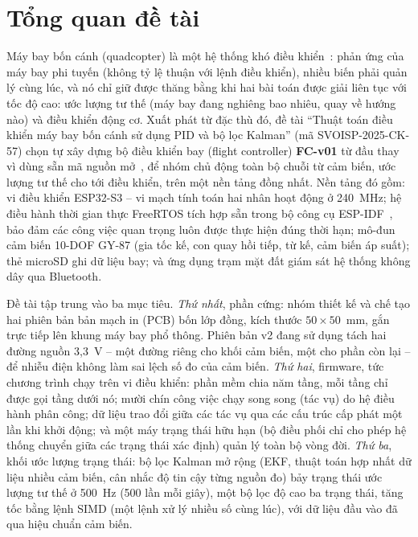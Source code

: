 \chapter{Tổng quan đề tài}

Máy bay bốn cánh (quadcopter) là một hệ thống khó điều khiển~\cite{quan2020}: phản ứng của máy bay phi tuyến (không tỷ lệ thuận với lệnh điều khiển), nhiều biến phải quản lý cùng lúc, và nó chỉ giữ được thăng bằng khi hai bài toán được giải liên tục với tốc độ cao: ước lượng tư thế (máy bay đang nghiêng bao nhiêu, quay về hướng nào) và điều khiển động cơ. Xuất phát từ đặc thù đó, đề tài ``Thuật toán điều khiển máy bay bốn cánh sử dụng PID và bộ lọc Kalman'' (mã SVOISP-2025-CK-57) chọn tự xây dựng bộ điều khiển bay (flight controller) \textbf{FC-v01} từ đầu thay vì dùng sẵn mã nguồn mở~\cite{ardupilot-esp32,px4-hw}, để nhóm chủ động toàn bộ chuỗi từ cảm biến, ước lượng tư thế cho tới điều khiển, trên một nền tảng đồng nhất. Nền tảng đó gồm: vi điều khiển ESP32-S3 -- vi mạch tính toán hai nhân hoạt động ở 240~MHz; hệ điều hành thời gian thực FreeRTOS tích hợp sẵn trong bộ công cụ ESP-IDF~\cite{idf-freertos}, bảo đảm các công việc quan trọng luôn được thực hiện đúng thời hạn; mô-đun cảm biến 10-DOF GY-87 (gia tốc kế, con quay hồi tiếp, từ kế, cảm biến áp suất); thẻ microSD ghi dữ liệu bay; và ứng dụng trạm mặt đất giám sát hệ thống không dây qua Bluetooth.

Đề tài tập trung vào ba mục tiêu. \textit{Thứ nhất}, phần cứng: nhóm thiết kế và chế tạo hai phiên bản bản mạch in (PCB) bốn lớp đồng, kích thước $50 \times 50$~mm, gắn trực tiếp lên khung máy bay phổ thông. Phiên bản v2 đang sử dụng tách hai đường nguồn 3,3~V -- một đường riêng cho khối cảm biến, một cho phần còn lại -- để nhiễu điện không làm sai lệch số đo của cảm biến. \textit{Thứ hai}, firmware, tức chương trình chạy trên vi điều khiển: phần mềm chia năm tầng, mỗi tầng chỉ được gọi tầng dưới nó; mười chín công việc chạy song song (tác vụ) do hệ điều hành phân công; dữ liệu trao đổi giữa các tác vụ qua các cấu trúc cấp phát một lần khi khởi động; và một máy trạng thái hữu hạn (bộ điều phối chỉ cho phép hệ thống chuyển giữa các trạng thái xác định) quản lý toàn bộ vòng đời. \textit{Thứ ba}, khối ước lượng trạng thái: bộ lọc Kalman mở rộng (EKF, thuật toán hợp nhất dữ liệu nhiều cảm biến, cân nhắc độ tin cậy từng nguồn đo) bảy trạng thái ước lượng tư thế ở 500~Hz (500 lần mỗi giây), một bộ lọc độ cao ba trạng thái, tăng tốc bằng lệnh SIMD (một lệnh xử lý nhiều số cùng lúc), với dữ liệu đầu vào đã qua hiệu chuẩn cảm biến.

